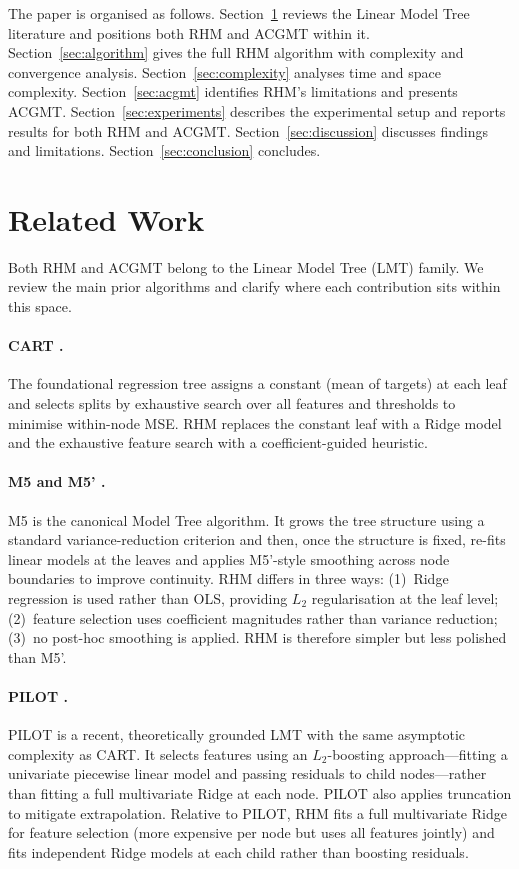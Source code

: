 \documentclass[11pt,a4paper]{article}
\begin{document}
The paper is organised as follows. Section~\ref{sec:related} reviews the Linear Model Tree literature and positions both RHM and ACGMT within it. Section~\ref{sec:algorithm} gives the full RHM algorithm with complexity and convergence analysis. Section~\ref{sec:complexity} analyses time and space complexity. Section~\ref{sec:acgmt} identifies RHM's limitations and presents ACGMT. Section~\ref{sec:experiments} describes the experimental setup and reports results for both RHM and ACGMT. Section~\ref{sec:discussion} discusses findings and limitations. Section~\ref{sec:conclusion} concludes.

\section{Related Work}\label{sec:related}

Both RHM and ACGMT belong to the Linear Model Tree (LMT) family. We review the main prior algorithms and clarify where each contribution sits within this space.

\paragraph{CART \citep{breiman1984}.} The foundational regression tree assigns a constant (mean of targets) at each leaf and selects splits by exhaustive search over all features and thresholds to minimise within-node MSE. RHM replaces the constant leaf with a Ridge model and the exhaustive feature search with a coefficient-guided heuristic.

\paragraph{M5 and M5' \citep{quinlan1992,wang1997}.} M5 is the canonical Model Tree algorithm. It grows the tree structure using a standard variance-reduction criterion and then, once the structure is fixed, re-fits linear models at the leaves and applies M5'-style smoothing across node boundaries to improve continuity. RHM differs in three ways: (1)~Ridge regression is used rather than OLS, providing $L_2$ regularisation at the leaf level; (2)~feature selection uses coefficient magnitudes rather than variance reduction; (3)~no post-hoc smoothing is applied. RHM is therefore simpler but less polished than M5'.

\paragraph{PILOT \citep{raymaekers2024}.} PILOT is a recent, theoretically grounded LMT with the same asymptotic complexity as CART. It selects features using an $L_2$-boosting approach---fitting a univariate piecewise linear model and passing residuals to child nodes---rather than fitting a full multivariate Ridge at each node. PILOT also applies truncation to mitigate extrapolation. Relative to PILOT, RHM fits a full multivariate Ridge for feature selection (more expensive per node but uses all features jointly) and fits independent Ridge models at each child rather than boosting residuals.
\end{document}
